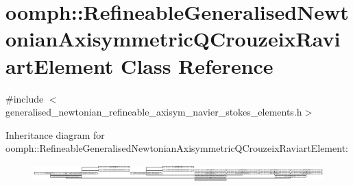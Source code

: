 \hypertarget{classoomph_1_1RefineableGeneralisedNewtonianAxisymmetricQCrouzeixRaviartElement}{}\section{oomph\+:\+:Refineable\+Generalised\+Newtonian\+Axisymmetric\+Q\+Crouzeix\+Raviart\+Element Class Reference}
\label{classoomph_1_1RefineableGeneralisedNewtonianAxisymmetricQCrouzeixRaviartElement}


{\ttfamily \#include $<$generalised\+\_\+newtonian\+\_\+refineable\+\_\+axisym\+\_\+navier\+\_\+stokes\+\_\+elements.\+h$>$}

Inheritance diagram for oomph\+:\+:Refineable\+Generalised\+Newtonian\+Axisymmetric\+Q\+Crouzeix\+Raviart\+Element\+:\begin{figure}[H]
\begin{center}
\leavevmode
\includegraphics[height=0.664767cm]{classoomph_1_1RefineableGeneralisedNewtonianAxisymmetricQCrouzeixRaviartElement}
\end{center}
\end{figure}
